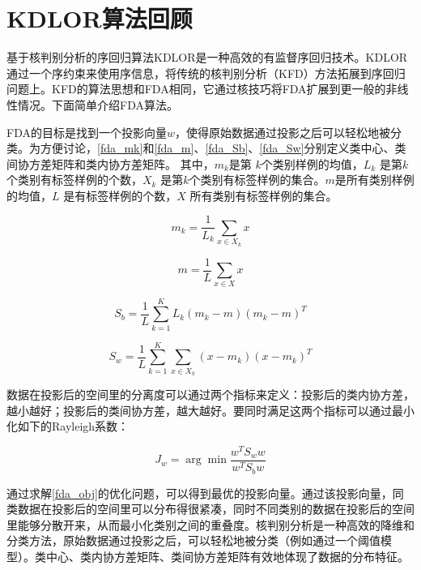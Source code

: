 \section{KDLOR算法回顾}
基于核判别分析的序回归算法KDLOR\citep{sun2010kernel}是一种高效的有监督序回归技术。KDLOR通过一个序约束来使用序信息，将传统的核判别分析（KFD）方法拓展到序回归问题上。KFD的算法思想和FDA相同，它通过核技巧将FDA扩展到更一般的非线性情况。下面简单介绍FDA算法。

FDA的目标是找到一个投影向量\(w\)，使得原始数据通过投影之后可以轻松地被分类。为方便讨论，\autoref{fda_mk}和\autoref{fda_m}、\autoref{fda_Sb}、\autoref{fda_Sw}分别定义类中心、类间协方差矩阵和类内协方差矩阵。 其中，\(m_{k}\)是第 \(k\)个类别样例的均值，\(L_{k}\) 是第\(k\)个类别有标签样例的个数，\(X_{k}\) 是第\(k\)个类别有标签样例的集合。\(m\)是所有类别样例的均值，\(L\) 是有标签样例的个数，\(X\) 所有类别有标签样例的集合。

\begin{equation}
\label{fda_mk}
m_{k}=\frac{1}{L_{k}}\sum_{x\in X_{k}}x
\end{equation}

\begin{equation}
\label{fda_m}
m =\frac{1}{L}\sum_{x \in X} x
\end{equation}

\begin{equation}
\label{fda_Sb}
S_{b} = \frac{1}{L}\sum_{k=1}^{K} L_{k} (m_{k} - m)(m_{k} - m)^{T}
\end{equation}

\begin{equation}
\label{fda_Sw}
S_{w} = \frac{1}{L}\sum_{k=1}^{K}\sum_{x\in X_{k}}(x-m_{k})(x-m_{k})^{T}
\end{equation}

数据在投影后的空间里的分离度可以通过两个指标来定义：投影后的类内协方差，越小越好；投影后的类间协方差，越大越好。要同时满足这两个指标可以通过最小化如下的Rayleigh系数：

\begin{equation}
\label{fda_obj}
J_{w} = \arg \min{\frac{w^{T} S_{w} w}{w^{T} S_{b} w} }
\end{equation}

通过求解\autoref{fda_obj}的优化问题，可以得到最优的投影向量。通过该投影向量，同类数据在投影后的空间里可以分布得很紧凑，同时不同类别的数据在投影后的空间里能够分散开来，从而最小化类别之间的重叠度。核判别分析是一种高效的降维和分类方法，原始数据通过投影之后，可以轻松地被分类（例如通过一个阈值模型）。类中心、类内协方差矩阵、类间协方差矩阵有效地体现了数据的分布特征。

